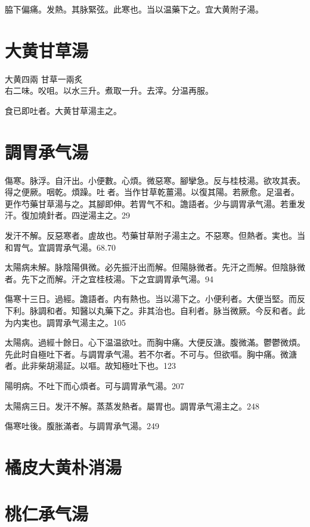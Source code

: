 脇下偏痛。{\khaaitp 发熱。}其脉緊弦。此寒也。{\khaaitp 当}以温藥下之。宜大黄附子湯。

\section{大黄甘草湯}

大黄{\scriptsize 四兩} 甘草{\scriptsize 一兩炙}\\
右二味。㕮咀。以水三升。煮取一升。去滓。分温再服。

食已即吐者。大黄甘草湯主之。

\section{調胃承气湯}

傷寒。脉浮。自汗出。小便數。心煩。微惡寒。腳攣急。反与桂枝湯。欲攻其表。得之便厥。咽乾。煩躁。吐{\sungtpii 𠱘}者。当作甘草乾薑湯。以復其陽。若厥愈。足温者。更作芍藥甘草湯与之。其腳即伸。若胃气不和。譫語者。少与{\khaaitp 調胃}承气湯。若重发汗。復加燒針者。四逆湯主之。29

发汗不解。反惡寒者。虗故也。芍藥甘草附子湯主之。不惡寒。但熱者。実也。当和胃气。宜調胃承气湯。68.70

太陽病未解。脉陰陽俱微。必先振汗出而解。但陽{\khaaitp 脉}微者。先汗之而解。但陰{\khaaitp 脉}微者。先下之而解。汗之宜桂枝湯。下之宜{\khaaitp 調胃}承气湯。94

傷寒十三日。過經。譫語者。内有熱也。当以湯下之。小便利者。大便当堅。而反{\khaaitp 下}利。脉調和者。知醫以丸藥下之。非其治也。自利者。脉当微厥。今反和者。此为内実也。{\khaaitp 調胃}承气湯主之。105

太陽病。過經十餘日。心下温温欲吐。而胸中痛。大便反溏。腹微滿。鬱鬱微煩。先{\khaaitp 此}时自極吐下者。与{\khaaitp 調胃}承气湯。若不尔者。不可与。但欲嘔。胸中痛。微溏者。此非柴胡湯証。以嘔。故知極吐下也。123

陽明病。不吐下而{\khaaitp 心}煩者。可与{\khaaitp 調胃}承气湯。207

太陽病三日。发汗不解。蒸蒸发熱者。{\khaaitp 屬胃也。調胃}承气湯主之。248

傷寒吐後。腹胀滿者。与{\khaaitp 調胃}承气湯。249

\section{橘皮大黄朴消湯}

\section{桃仁承气湯}

